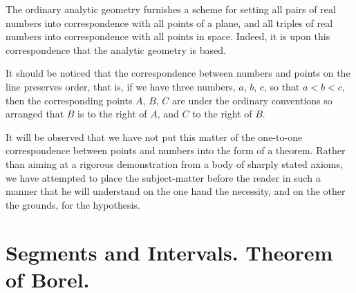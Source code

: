 \documentclass[a4paper,12pt]{book}[2004/02/16]
\providecommand{\hypertarget}[2]{#2}
\theoremstyle{ilemma}
\theoremstyle{itheorem}
\theoremstyle{iother}
\theoremstyle{icorollary}
\theoremstyle{numcorollary}
\theoremstyle{idefinition}
\begin{document}
The ordinary analytic geometry furnishes a scheme for setting all
pairs of real numbers into correspondence with all points of a plane,
and all triples of real numbers into correspondence with all points in
space. Indeed, it is upon this correspondence that the analytic
geometry is based.

It should be noticed that the correspondence between numbers and
points on the line preserves order, that is, if we have three numbers,
$a$, $b$, $c$, so that $a < b < c$, then the corresponding points $A$,
$B$, $C$ are under the ordinary conventions so arranged that $B$ is to
the right of $A$, and $C$ to the right of $B$.

It will be observed that we have not put this matter of the one-to-one
correspondence between points and numbers into the form of a
theorem. Rather than aiming at a rigorous demonstration from a body of
sharply stated axioms, we have attempted to place the subject-matter
before the reader in such a manner that he will understand on the one
hand the necessity, and on the other the grounds, for the hypothesis.

\section{Segments and Intervals. Theorem of Borel.}\hypertarget{chIIsec2}{}%
\end{document}
